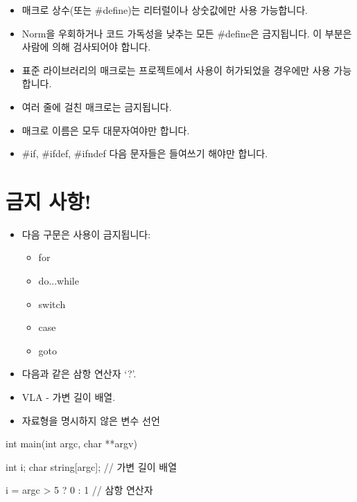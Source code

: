 \documentclass{42-ko}
\begin{document}
        \begin{itemize}

            \item 매크로 상수(또는 \#define)는 리터럴이나
                상숫값에만 사용 가능합니다.
            \item Norm을 우회하거나 코드 가독성을 낮추는 모든 \#define은 금지됩니다.
                이 부분은 사람에 의해 검사되어야 합니다.
            \item 표준 라이브러리의 매크로는 프로젝트에서
                사용이 허가되었을 경우에만 사용 가능합니다.
            \item 여러 줄에 걸친 매크로는 금지됩니다.
            \item 매크로 이름은 모두 대문자여야만 합니다.
            \item \#if, \#ifdef, \#ifndef 다음 문자들은 들여쓰기 해야만 합니다.

        \end{itemize}
        \newpage


    \section{금지 사항!}

        \begin{itemize}

            \item 다음 구문은 사용이 금지됩니다:

                \begin{itemize}

                    \item for
                    \item do...while
                    \item switch
                    \item case
                    \item goto

                \end{itemize}

            \item 다음과 같은 삼항 연산자 `?'.

            \item VLA - 가변 길이 배열.

            \item 자료형을 명시하지 않은 변수 선언

        \end{itemize}
        \begin{42ccode}
    int main(int argc, char **argv)
    {
        int     i;
        char    string[argc]; // 가변 길이 배열

        i = argc > 5 ? 0 : 1 // 삼항 연산자
    }
        \end{42ccode}
        \newpage
\end{document}
